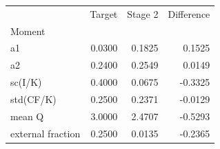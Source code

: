 \begin{tabular}{lrrr}
\toprule
 & Target & Stage 2 & Difference \\
Moment &  &  &  \\
\midrule
a1 & 0.0300 & 0.1825 & 0.1525 \\
a2 & 0.2400 & 0.2549 & 0.0149 \\
sc(I/K) & 0.4000 & 0.0675 & -0.3325 \\
std(CF/K) & 0.2500 & 0.2371 & -0.0129 \\
mean Q & 3.0000 & 2.4707 & -0.5293 \\
external fraction & 0.2500 & 0.0135 & -0.2365 \\
\bottomrule
\end{tabular}
